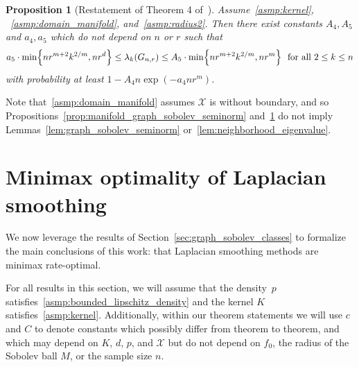 \documentclass{article}
\newcommand{\1}{\mathbf{1}}
\newcommand{\Xset}{\mathcal{X}}
\theoremstyle{alden}
\theoremstyle{aldenthm}
\newtheorem{proposition}{Proposition}
\theoremstyle{definition}
\theoremstyle{remark}
\begin{document}
\begin{proposition}[Restatement of Theorem 4 of~\cite{trillos2019}]
	\label{prop:manifold_neighborhood_eigenvalue}
	Assume~\ref{asmp:kernel}, ~\ref{asmp:domain_manifold}, and~\ref{asmp:radius2}. Then there exist constants $A_4, A_5$ and $a_4,a_5$ which do not depend on $n$ or $r$ such that 
	\begin{equation}
	\label{eqn:manifold_neighborhood_eigenvalue}
	a_5 \cdot \min\Bigl\{nr^{m + 2}k^{2/m},nr^d\Bigr\} \leq \lambda_k(G_{n,r}) \leq A_5 \cdot \min\Bigl\{nr^{m + 2}k^{2/m}, nr^m\Bigr\}~~\textrm{for all $2 \leq k \leq n$}	
	\end{equation}
	with probability at least $1 - A_4n\exp(-a_4nr^m)$.
\end{proposition}
Note that~\ref{asmp:domain_manifold} assumes $\Xset$ is without boundary, and so Propositions~\ref{prop:manifold_graph_sobolev_seminorm} and~\ref{prop:manifold_neighborhood_eigenvalue} do not imply Lemmas~\ref{lem:graph_sobolev_seminorm} or~\ref{lem:neighborhood_eigenvalue}.

\section{Minimax optimality of Laplacian smoothing}
\label{sec:minimax_optimal_laplacian_smoothing}

We now leverage the results of Section~\ref{sec:graph_sobolev_classes} to formalize the main conclusions of this work: that Laplacian smoothing methods are minimax rate-optimal. 

For all results in this section, we will assume that the density~$p$ satisfies~\ref{asmp:bounded_lipschitz_density} and the kernel $K$ satisfies~\ref{asmp:kernel}. Additionally, within our theorem statements we will use $c$ and $C$ to denote constants which possibly differ from theorem to theorem, and which may depend on $K$, $d$, $p$, and $\Xset$ but do not depend on $f_0$, the radius of the Sobolev ball $M$, or the sample size $n$. 
\end{document}

